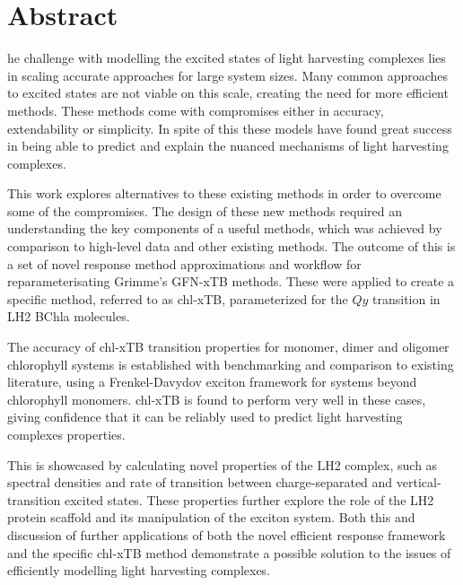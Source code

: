 %
%
%

\chapter*{Abstract}
\begin{SingleSpace}
he challenge with modelling the excited states of light harvesting complexes
lies in scaling accurate approaches for large system sizes. Many common approaches 
to excited states are not viable on this scale, creating the need for more efficient
methods. These methods come with compromises either in accuracy, extendability or simplicity.
In spite of this these models have found great success in being able to predict 
and explain the nuanced mechanisms of light harvesting complexes. 

This work explores alternatives to these existing methods in order to overcome some
of the compromises. The design of these new methods required an understanding the
key components of a useful methods, which was achieved by comparison to high-level
data and other existing methods. The outcome of this is a set of novel response 
method approximations and workflow for reparameterisating Grimme's GFN-xTB methods.
These were applied to create a specific method, referred to as chl-xTB, parameterized
for the $Qy$ transition in LH2 BChla molecules.

The accuracy of chl-xTB transition properties for monomer, dimer and oligomer chlorophyll
systems is established with benchmarking and comparison to existing literature,
using a Frenkel-Davydov exciton framework for systems beyond chlorophyll monomers.
chl-xTB is found to perform very well in these cases, giving confidence that it 
can be reliably used to predict light harvesting complexes properties.

This is showcased by calculating novel properties of the LH2 complex, such as spectral
densities and rate of transition between charge-separated and vertical-transition
excited states. These properties further explore the role of the LH2 protein scaffold
and its manipulation of the exciton system. Both this and discussion of further
applications of both the novel efficient response framework and the specific chl-xTB
method demonstrate a possible solution to the issues of efficiently modelling light 
harvesting complexes.

\end{SingleSpace}
\clearpage